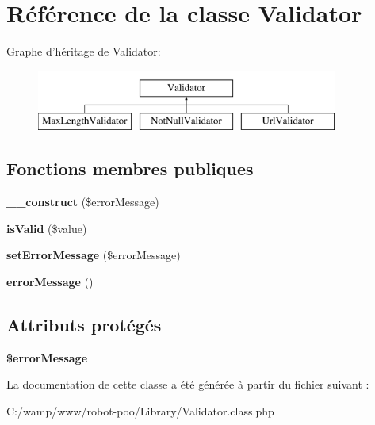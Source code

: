 \hypertarget{class_library_1_1_validator}{\section{Référence de la classe Validator}
\label{class_library_1_1_validator}
}
Graphe d'héritage de Validator\+:\begin{figure}[H]
\begin{center}
\leavevmode
\includegraphics[height=2.000000cm]{class_library_1_1_validator}
\end{center}
\end{figure}
\subsection*{Fonctions membres publiques}
\begin{DoxyCompactItemize}
\item 
\hypertarget{class_library_1_1_validator_af037a69d8a88394918c750295c2a795c}{{\bfseries \+\_\+\+\_\+construct} (\$error\+Message)}\label{class_library_1_1_validator_af037a69d8a88394918c750295c2a795c}

\item 
\hypertarget{class_library_1_1_validator_a72063d2e922edda5321b1970297eb0c3}{{\bfseries is\+Valid} (\$value)}\label{class_library_1_1_validator_a72063d2e922edda5321b1970297eb0c3}

\item 
\hypertarget{class_library_1_1_validator_ade45257a25c7924dcc04cec5cb1af70f}{{\bfseries set\+Error\+Message} (\$error\+Message)}\label{class_library_1_1_validator_ade45257a25c7924dcc04cec5cb1af70f}

\item 
\hypertarget{class_library_1_1_validator_a01effa419e1a208366c688d817379f1a}{{\bfseries error\+Message} ()}\label{class_library_1_1_validator_a01effa419e1a208366c688d817379f1a}

\end{DoxyCompactItemize}
\subsection*{Attributs protégés}
\begin{DoxyCompactItemize}
\item 
\hypertarget{class_library_1_1_validator_a25b5b4c70be7dd968b64cb57e5f9565d}{{\bfseries \$error\+Message}}\label{class_library_1_1_validator_a25b5b4c70be7dd968b64cb57e5f9565d}

\end{DoxyCompactItemize}


La documentation de cette classe a été générée à partir du fichier suivant \+:\begin{DoxyCompactItemize}
\item 
C\+:/wamp/www/robot-\/poo/\+Library/Validator.\+class.\+php\end{DoxyCompactItemize}
